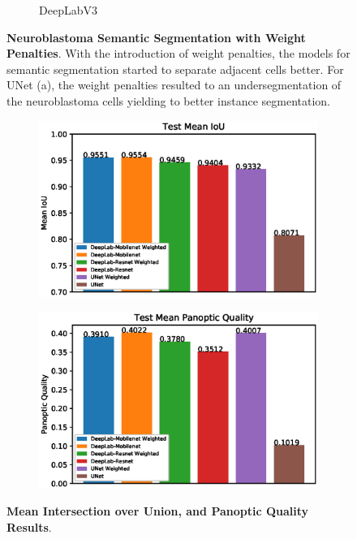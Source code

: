 \documentclass[10pt, journal, compsoc]{IEEEtran}
\begin{document}
\begin{figure}
\begin{subfigure}[b]{0.45\linewidth}
\caption{DeepLabV3}
\end{subfigure}
\caption{\textbf{Neuroblastoma Semantic Segmentation with Weight Penalties}. With the introduction of weight penalties, the models for semantic segmentation started to separate adjacent cells better. For UNet (a), the weight penalties resulted to an undersegmentation of the neuroblastoma cells yielding to better instance segmentation.}
\label{fig:segmentation_with_weight_map}
\end{figure}

\begin{figure}
\centering
\begin{subfigure}[b]{\linewidth}
\includegraphics[width=\linewidth]{graphs/Test-Mean-IoU.eps}
\end{subfigure}
\begin{subfigure}[b]{\linewidth}
\includegraphics[width=\linewidth]{graphs/Test-Mean-Panoptic-Quality.eps}
\end{subfigure}
\caption{\textbf{Mean Intersection over Union, and Panoptic Quality Results}.}
\label{fig:graph_results}
\end{figure}
\end{document}
